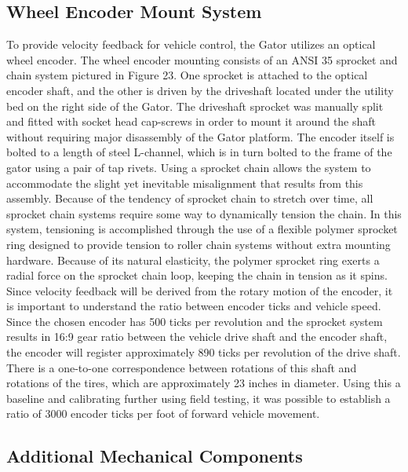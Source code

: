 \subsection{Wheel Encoder Mount System}
To provide velocity feedback for vehicle control, the Gator utilizes an optical wheel encoder. The wheel encoder mounting consists of an ANSI 35 sprocket and chain system pictured in Figure 23. One sprocket is attached to the optical encoder shaft, and the other is driven by the driveshaft located under the utility bed on the right side of the Gator. The driveshaft sprocket was manually split and fitted with socket head cap-screws in order to mount it around the shaft without requiring major disassembly of the Gator platform. The encoder itself is bolted to a length of steel L-channel, which is in turn bolted to the frame of the gator using a pair of tap rivets. Using a sprocket chain allows the system to accommodate the slight yet inevitable misalignment that results from this assembly. Because of the tendency of sprocket chain to stretch over time, all sprocket chain systems require some way to dynamically tension the chain. In this system, tensioning is accomplished through the use of a flexible polymer sprocket ring designed to provide tension to roller chain systems without extra mounting hardware. Because of its natural elasticity, the polymer sprocket ring exerts a radial force on the sprocket chain loop, keeping the chain in tension
as it spins. Since velocity feedback will be derived from the rotary motion of the encoder, it is important to understand the ratio between encoder ticks and vehicle speed. Since the chosen encoder has 500 ticks per revolution and the sprocket system results in 16:9 gear ratio between the vehicle drive shaft and the encoder shaft, the encoder will register approximately 890 ticks per revolution of the drive shaft. There is a one-to-one correspondence between rotations of this shaft and rotations of the tires, which are approximately 23 inches in diameter. Using this a baseline and calibrating further using field testing, it was possible to establish a ratio of 3000 encoder ticks per foot of forward vehicle movement.





\subsection{Additional Mechanical Components}